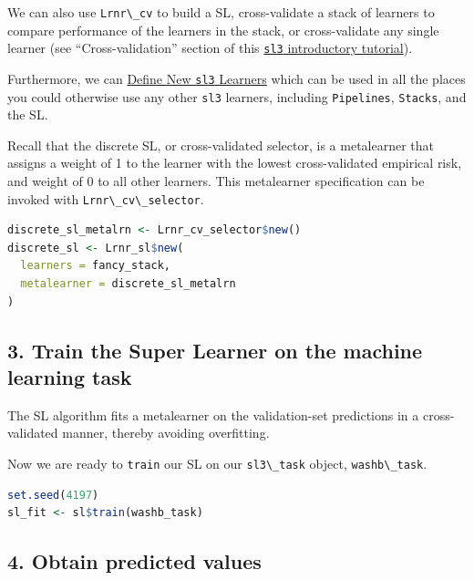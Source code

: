 \documentclass[
  12pt, krantz2,
]{krantz}
\newcommand{\passthrough}[1]{#1}
\theoremstyle{definition}
\theoremstyle{definition}
\theoremstyle{definition}
\newcommand{\1}{\mathbbm{1}}
\begin{document}
We can also use \passthrough{\lstinline!Lrnr\_cv!} to build a SL, cross-validate a stack of
learners to compare performance of the learners in the stack, or cross-validate
any single learner (see ``Cross-validation'' section of this \href{https://tlverse.org/sl3/articles/intro_sl3.html}{\passthrough{\lstinline!sl3!}
introductory tutorial}).

Furthermore, we can \href{https://tlverse.org/sl3/articles/custom_lrnrs.html}{Define New \passthrough{\lstinline!sl3!}
Learners} which can be used
in all the places you could otherwise use any other \passthrough{\lstinline!sl3!} learners, including
\passthrough{\lstinline!Pipelines!}, \passthrough{\lstinline!Stacks!}, and the SL.

Recall that the discrete SL, or cross-validated selector, is a metalearner that
assigns a weight of 1 to the learner with the lowest cross-validated empirical
risk, and weight of 0 to all other learners. This metalearner specification can
be invoked with \passthrough{\lstinline!Lrnr\_cv\_selector!}.

\begin{lstlisting}[language=R]
discrete_sl_metalrn <- Lrnr_cv_selector$new()
discrete_sl <- Lrnr_sl$new(
  learners = fancy_stack,
  metalearner = discrete_sl_metalrn
)
\end{lstlisting}

\hypertarget{train-the-super-learner-on-the-machine-learning-task}{%
\subsection*{3. Train the Super Learner on the machine learning task}\label{train-the-super-learner-on-the-machine-learning-task}}


The SL algorithm fits a metalearner on the validation-set predictions in a
cross-validated manner, thereby avoiding overfitting.

Now we are ready to \passthrough{\lstinline!train!} our SL on our \passthrough{\lstinline!sl3\_task!} object, \passthrough{\lstinline!washb\_task!}.

\begin{lstlisting}[language=R]
set.seed(4197)
sl_fit <- sl$train(washb_task)
\end{lstlisting}

\hypertarget{obtain-predicted-values}{%
\subsection*{4. Obtain predicted values}\label{obtain-predicted-values}}
\end{document}
